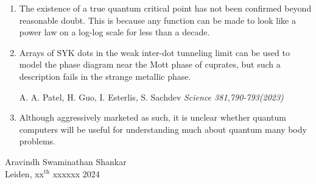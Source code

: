 \documentclass[pdftex,a5paper]{dissertation}
\begin{document}
{\begin{enumerate}[leftmargin=*]
\item The existence of a true quantum critical point has not been confirmed beyond reasonable doubt. This is because any function can be made to look like a power law on a log-log scale for less than a decade.  

\item Arrays of SYK dots in the weak inter-dot tunneling limit can be used to model the phase diagram near the Mott phase of cuprates, but such a description fails in the strange metallic phase.
\vspace{-2pt}
\begin{flushright}
    A. A. Patel, H. Guo, I. Esterlis, S. Sachdev \emph{Science 381,790-793(2023)} 
\end{flushright}


\item Although aggressively marketed as such, it is unclear whether quantum computers will be useful for understanding much about quantum many body problems. 

\end{enumerate}

\vspace{10pt}

\begin{flushright}

Aravindh Swaminathan Shankar\\
Leiden, xx$^{\text{th}}$ xxxxxx 2024

\end{flushright}
}
\end{document}
